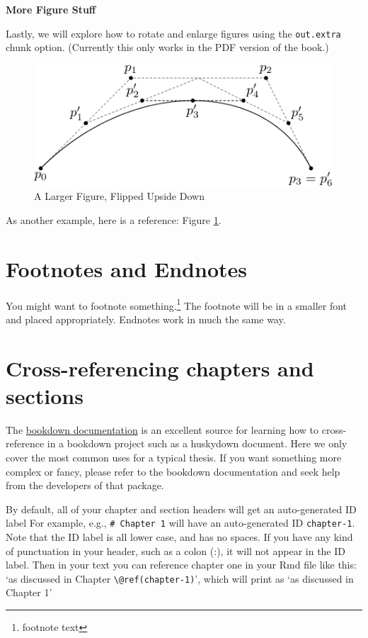 \documentclass [11pt, proquest] {uwthesis}[2015/03/03]
\begin{document}
\textbf{More Figure Stuff}

Lastly, we will explore how to rotate and enlarge figures using the
\texttt{out.extra} chunk option. (Currently this only works in the PDF
version of the book.)
\begin{figure}
\includegraphics[angle=180, scale=1.1]{figure/subdivision} \caption{A Larger Figure, Flipped Upside Down}\label{fig:subd2}
\end{figure}
As another example, here is a reference: Figure \ref{fig:subd2}.

\section{Footnotes and Endnotes}\label{footnotes-and-endnotes}

You might want to footnote something.\footnote{footnote text} The
footnote will be in a smaller font and placed appropriately. Endnotes
work in much the same way.

\section{Cross-referencing chapters and
sections}\label{cross-referencing-chapters-and-sections}

The
\href{https://bookdown.org/yihui/bookdown/cross-references.html}{bookdown
documentation} is an excellent source for learning how to
cross-reference in a bookdown project such as a huskydown document. Here
we only cover the most common uses for a typical thesis. If you want
something more complex or fancy, please refer to the bookdown
documentation and seek help from the developers of that package.

By default, all of your chapter and section headers will get an
auto-generated ID label For example, e.g., \texttt{\#\ Chapter\ 1} will
have an auto-generated ID \texttt{chapter-1}. Note that the ID label is
all lower case, and has no spaces. If you have any kind of punctuation
in your header, such as a colon (:), it will not appear in the ID label.
Then in your text you can reference chapter one in your Rmd file like
this: `as discussed in Chapter
\texttt{\textbackslash{}@ref(chapter-1)}', which will print as `as
discussed in Chapter 1'
\end{document}
